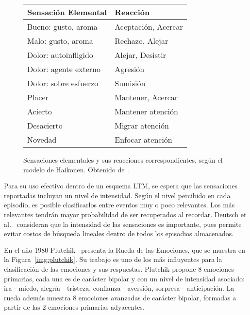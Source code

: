 \begin{figure}[!ht]
	\centering
	\begin{tabular}{| l | l |}
		\hline
		\rowcolor{gray!50}
		Sensación Elemental & Reacción  \\ 
		\hline Bueno: gusto, aroma & Aceptación, Acercar \\ 
		\hline Malo: gusto, aroma & Rechazo, Alejar \\ 
		\hline Dolor: autoinfligido  & Alejar, Desistir \\ 
		\hline Dolor: agente externo & Agresión \\ 
		\hline Dolor: sobre esfuerzo & Sumisión \\ 
		\hline Placer & Mantener, Acercar \\ 
		\hline Acierto & Mantener atención \\ 
		\hline Desacierto & Migrar atención \\ 
		\hline Novedad & Enfocar atención \\ 
		\hline 
	\end{tabular} 
	\caption[Sensaciones elementales y reacciones en el modelo de Haikonen.]
	{\small Sensaciones elementales y sus reacciones correspondientes, según el modelo de Haikonen. Obtenido de~\cite{Dodd2005}.}
	\label{img:emotional_haikonen}
\end{figure}

Para su uso efectivo dentro de un esquema LTM, se espera que las sensaciones reportadas incluyan un nivel de intensidad. Según el nivel percibido en cada episodio, es posible clasificarlos entre eventos muy o poco relevantes. Los más relevantes tendrán mayor probabilidad de ser recuperados al recordar. Deutsch et al.~\cite{Deutsch2008} consideran que la intensidad de las sensaciones es importante, pues permite evitar costos de búsqueda lineales dentro de todos los episodios almacenados.

En el año 1980 Plutchik~\cite{plutchik1980} presenta la Rueda de las Emociones, que se muestra en la Figura~\ref{img:plutchik}. Su trabajo es uno de los más influyentes para la clasificación de las emociones y sus respuestas. Plutchik propone 8 emociones primarias, cada una es de carácter bipolar y con un nivel de intensidad asociado: ira - miedo, alegría - tristeza, confianza - aversión, sorpresa - anticipación. La rueda además muestra 8 emociones avanzadas de carácter bipolar, formadas a partir de las 2 emociones primarias adyacentes.

